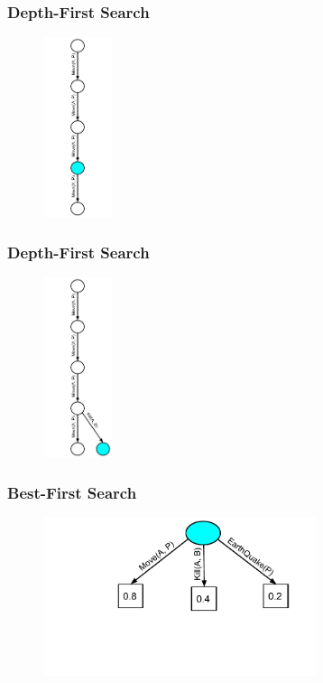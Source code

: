 \documentclass{beamer}
\begin{document}
\begin{frame}[fragile]
\frametitle{Depth-First Search}
\begin{figure}[h]
	\includegraphics[width=2cm]{Diagrams/DepthFirst/DepthFirstFive.pdf}
	\centering
\end{figure}
\end{frame}

\begin{frame}[fragile]
\frametitle{Depth-First Search}
\begin{figure}[h]
	\includegraphics[width=2cm]{Diagrams/DepthFirst/DepthFirstSix.pdf}
	\centering
\end{figure}
\end{frame}



\begin{frame}[fragile]
\frametitle{Best-First Search}
\begin{figure}[h]
	\includegraphics[width=8cm]{Diagrams/BestFirst/BestTreeOne.pdf}
	\centering
\end{figure}
\end{frame}
\end{document}
